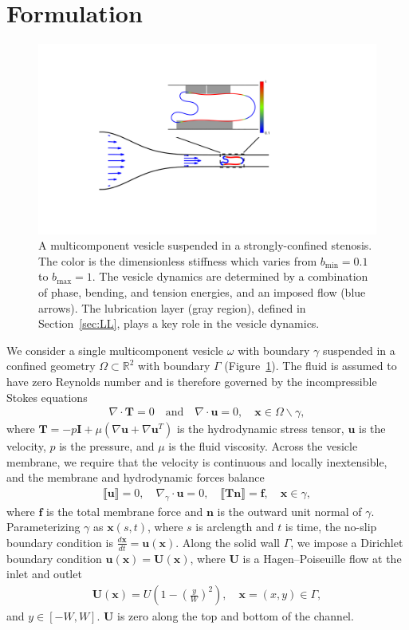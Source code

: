 \documentclass[twoside,twocolumn,9pt]{article}
\newcommand{\ff}{\mathbf{f}}
\newcommand{\nn}{\mathbf{n}}
\newcommand{\RR}{\mathbb{R}}
\newcommand{\uu}{\mathbf{u}}
\newcommand{\TT}{\mathbf{T}}
\newcommand{\UU}{\mathbf{U}}
\newcommand{\xx}{\mathbf{x}}
\begin{document}
\section{\label{sec:Formulation}Formulation}
\begin{figure}[h]
  \centering
  \includegraphics[width=0.9\columnwidth]{figures/schematic.pdf}
  \caption{\label{fig:schematic}\small A multicomponent vesicle
  suspended in a strongly-confined stenosis. The color is the
  dimensionless stiffness which varies from $b_{\min} = 0.1$ to
  $b_{\max} = 1$. The vesicle dynamics are determined by a combination
  of phase, bending, and tension energies, and an imposed flow (blue
  arrows). The lubrication layer (gray region), defined in
  Section~\ref{sec:LL}, plays a key role in the vesicle dynamics.}
\end{figure}
We consider a single multicomponent vesicle $\omega$ with boundary
$\gamma$ suspended in a confined geometry $\Omega \subset \RR ^2$ with
boundary $\Gamma$ (Figure~\ref{fig:schematic}). The fluid is assumed to
have zero Reynolds number and is therefore governed by the
incompressible Stokes equations
\begin{align}
  \nabla \cdot \TT = 0 \quad \text{and} \quad \nabla \cdot \uu = 0, 
    \quad \xx \in \Omega \backslash \gamma,
\end{align}
where $\TT = -p\mathbf{I} + \mu\left(\nabla \uu + \nabla \uu^T \right)$
is the hydrodynamic stress tensor, $\uu$ is the velocity, $p$ is the
pressure, and $\mu$ is the fluid viscosity. Across the vesicle membrane,
we require that the velocity is continuous and locally inextensible, and
the membrane and hydrodynamic forces balance
\begin{align}
  \llbracket \uu \rrbracket = 0, \quad 
  \nabla_{\gamma} \cdot \uu = 0, \quad
  \llbracket \TT\nn \rrbracket = \ff, \quad \xx \in \gamma,
\end{align}
where $\ff$ is the total membrane force and $\nn$ is the outward unit
normal of $\gamma$. Parameterizing $\gamma$ as $\xx(s,t)$, where $s$ is
arclength and $t$ is time, the no-slip boundary condition is
$\frac{d\xx}{dt} = \uu(\xx)$. Along the solid wall $\Gamma$, we impose a
Dirichlet boundary condition $\uu(\xx) = \UU(\xx)$, where $\UU$ is a
Hagen–Poiseuille flow at the inlet and outlet
\begin{align}
  \UU(\xx) = U \left(1 - \left(\frac{y}{W}\right)^2 \right), 
    \quad \xx = (x,y) \in \Gamma,
\end{align}
and $y \in [-W,W]$. $\UU$ is zero along the top and bottom of the
channel.
\end{document}
